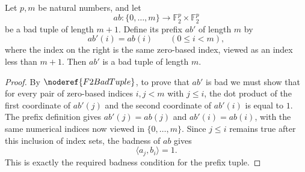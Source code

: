 \begin{helper}
Let \(p,m\) be natural numbers, and let
\[
  ab:\{0,\ldots,m\}\to \mathbb F_2^p\times\mathbb F_2^p
\]
be a bad tuple of length \(m+1\). Define its prefix \(ab'\) of length \(m\) by
\[
  ab'(i)=ab(i)
  \qquad(0\le i<m),
\]
where the index on the right is the same zero-based index, viewed as an index
less than \(m+1\). Then \(ab'\) is a bad tuple of length \(m\).
\end{helper}
\begin{proof}
By \(\noderef{F2BadTuple}\), to prove that \(ab'\) is bad we must show that
for every pair of zero-based indices \(i,j<m\) with \(j\le i\), the dot product
of the first coordinate of \(ab'(j)\) and the second coordinate of \(ab'(i)\)
is equal to \(1\). The prefix definition gives \(ab'(j)=ab(j)\) and
\(ab'(i)=ab(i)\), with the same numerical indices now viewed in
\(\{0,\ldots,m\}\). Since \(j\le i\) remains true after this inclusion of index
sets, the badness of \(ab\) gives
\[
  \langle a_j,b_i\rangle=1.
\]
This is exactly the required badness condition for the prefix tuple.
\end{proof}
